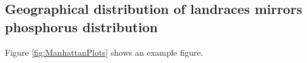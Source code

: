 \documentclass[9pt,twocolumn,twoside,lineno]{gsajnl}
\begin{document}
\begin{figure}[ht]
\label{fig:SoilMap}
\end{figure}

\subsection{ Geographical distribution of landraces mirrors phosphorus distribution}

Figure \ref{fig:ManhattanPlots} shows an example figure.
\end{document}
